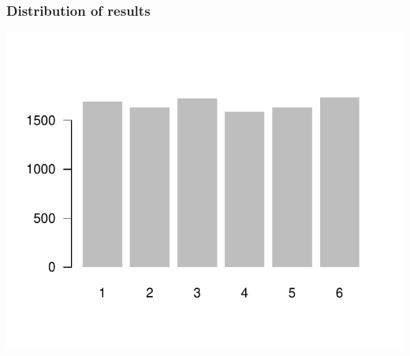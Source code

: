 \documentclass[12pt]{beamer}\usepackage[]{graphicx}\usepackage[]{color}
\newenvironment{knitrout}{}{} %
\begin{document}
\begin{frame}[fragile]
\frametitle{Distribution of results}

\begin{knitrout}\footnotesize
{}\color{fgcolor}

{\centering \includegraphics[width=.7\linewidth,height=.6\linewidth]{figure/unnamed-chunk-14-1} 

}



\end{knitrout}

\end{frame}


\begin{frame}
\begin{center}
\Large{}
\end{center}
\end{frame}

\end{document}

